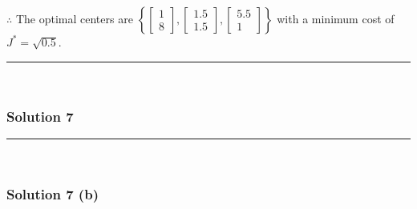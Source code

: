 \documentclass{article}
\begin{document}
\subsubsection*{\normalfont}{$\therefore$ The optimal centers are $\left\{ \begin{bmatrix}1 \\ 8\end{bmatrix}, \begin{bmatrix}1.5 \\ 1.5\end{bmatrix}, \begin{bmatrix}5.5 \\ 1\end{bmatrix} \right\}$ with a minimum cost of $J^*=\sqrt{0.5} $.}

\noindent\rule{\textwidth}{0.4pt}\\

\newpage

\subsubsection*{Solution 7}
\noindent\rule{\textwidth}{0.4pt}\\
\subsubsection*{Solution 7 (b)}
\end{document}
